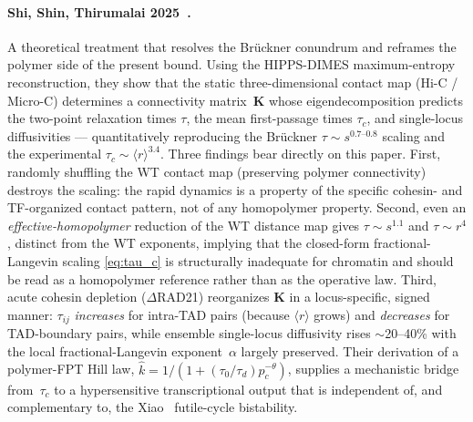 \documentclass[11pt]{article}
\begin{document}
\paragraph{Shi, Shin, Thirumalai 2025~\cite{Shi2025}.} A theoretical
treatment that resolves the Br\"uckner conundrum and reframes the polymer
side of the present bound. Using the HIPPS-DIMES maximum-entropy
reconstruction, they show that the static three-dimensional contact map
(Hi-C / Micro-C) determines a connectivity matrix~$\mathbf{K}$ whose
eigendecomposition predicts the two-point relaxation times $\tau$, the
mean first-passage times $\tau_c$, and single-locus diffusivities ---
quantitatively reproducing the Br\"uckner $\tau\sim s^{0.7\text{--}0.8}$
scaling and the experimental $\tau_c\sim\langle r\rangle^{3.4}$. Three
findings bear directly on this paper. First, randomly shuffling the WT
contact map (preserving polymer connectivity) destroys the scaling:
the rapid dynamics is a property of the specific cohesin- and TF-organized
contact pattern, not of any homopolymer property. Second, even an
\emph{effective-homopolymer} reduction of the WT distance map gives
$\tau\sim s^{1.1}$ and $\tau\sim r^{4}$, distinct from the WT exponents,
implying that the closed-form fractional-Langevin scaling
\eqref{eq:tau_c} is structurally inadequate for chromatin and should be
read as a homopolymer reference rather than as the operative law. Third,
acute cohesin depletion ($\Delta$RAD21) reorganizes $\mathbf{K}$ in a
locus-specific, signed manner: $\tau_{ij}$ \emph{increases} for intra-TAD
pairs (because $\langle r\rangle$ grows) and \emph{decreases} for
TAD-boundary pairs, while ensemble single-locus diffusivity rises
$\sim$20--40\% with the local fractional-Langevin exponent~$\alpha$
largely preserved. Their derivation of a polymer-FPT Hill law,
$\hat k = 1/(1+(\tau_0/\tau_d)p_c^{-\theta})$, supplies a mechanistic
bridge from~$\tau_c$ to a hypersensitive transcriptional output that is
independent of, and complementary to, the Xiao~\cite{Xiao2021}
futile-cycle bistability.
\end{document}
